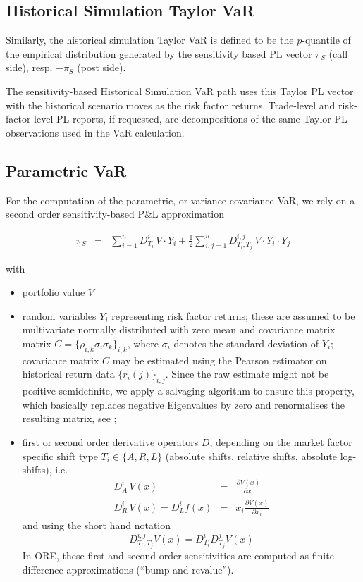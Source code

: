 \subsection{Historical Simulation Taylor VaR}\label{histtaylorvar}

Similarly, the historical simulation Taylor VaR is defined to be the $p$-quantile of the empirical distribution
generated by the sensitivity based PL vector $\pi_S$ (call side), resp. $-\pi_S$ (post side).

The sensitivity-based Historical Simulation VaR path uses this Taylor PL vector with the historical scenario moves as
the risk factor returns. Trade-level and risk-factor-level PL reports, if requested, are decompositions of the same
Taylor PL observations used in the VaR calculation.

\subsection{Parametric VaR}\label{parametricvar}

For the computation of the parametric, or variance-covariance VaR, we rely on a second order sensitivity-based P\&L approximation

\begin{eqnarray}\label{taylorPl2}
  \pi_S & = & \sum_{i=1}^n D^i_{T_i}\,V\cdot Y_i
        + \frac{1}{2} \sum_{i,j=1}^n D^{i,j}_{T_i,T_j}\,V\cdot Y_i\cdot Y_j
\end{eqnarray}

with
\begin{itemize}
\item portfolio value $V$
\item random variables $Y_i$ representing risk factor returns; these are assumed to be multivariate normally distributed with zero mean
and covariance matrix matrix $C = \{ \rho_{i,k} \sigma_i \sigma_k \}_{i,k}$, where $\sigma_i$ denotes the standard
deviation of $Y_i$; covariance matrix $C$ may be estimated using the Pearson estimator on historical return data
$\{ r_i(j) \}_{i,j}$. Since the raw estimate might not be positive semidefinite, we apply a salvaging algorithm to
ensure this property, which basically replaces negative Eigenvalues by zero and renormalises the resulting matrix, see
\cite{corrSalv};
\item first or second order derivative operators $D$, depending
on the market factor specific shift type $T_i \in \{ A,R,L \}$ (absolute shifts, relative shifts, absolute log-shifts), i.e.
\begin{eqnarray*}\label{derivs2}
  D^i_A \,V(x) &=& \frac{\partial V(x)}{\partial x_i} \\
  D^i_R \,V(x) = D^i_L f(x) &=& x_i\frac{\partial V(x)}{\partial x_i}
\end{eqnarray*}
and using the short hand notation
\begin{equation*}
  D^{i,j}_{T_i,T_j} V(x) = D^i_{T_i} D^j_{T_j} V(x)
\end{equation*}
In ORE, these first and second order sensitivities are computed as finite difference
approximations (``bump and revalue'').
\end{itemize}

